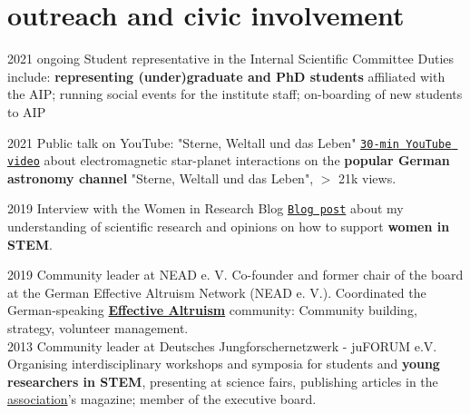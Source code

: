 \documentclass[]{k-cv} %
\begin{document}
\section{outreach and civic involvement}
\begin{entrylist}
\entry
{2021 \to ongoing}
{Student representative in the Internal Scientific Committee}
{}
{Duties include: \textbf{representing (under)graduate and PhD students} affiliated with the AIP; running social events for the institute staff; on-boarding of new students to AIP}

\entry
{2021}
{Public talk on YouTube: "Sterne, Weltall und das Leben"}
{}
{\texttt{\href{https://www.youtube.com/watch?v=LLHLobUifeY}{30-min YouTube video}} about electromagnetic star-planet interactions on the \textbf{popular German astronomy channel} "Sterne, Weltall und das Leben", $>$ 21k views.}

\entry
{2019}
{Interview with the Women in Research Blog}
{}
{\texttt{\href{https://womeninresearchblog.wordpress.com/2019/06/26/ekaterina-germany/}{Blog post}} about my understanding of scientific research and opinions on how to support \textbf{women in STEM}.}

\entry
{2019 }
{Community leader at NEAD e. V.}
{}
{Co-founder and former chair of the board at the German Effective Altruism Network (NEAD e. V.). Coordinated the German-speaking \href{https://www.effectivealtruism.com/}{\textbf{Effective Altruism}} community: Community building, strategy, volunteer management. \\}
\entry
{2013 }
{Community leader at Deutsches Jungforschernetzwerk - juFORUM e.V.}
{}
{Organising interdisciplinary workshops and symposia for students and \textbf{young researchers in STEM}, presenting at science fairs, publishing articles in the \href{https://www.juforum.de/}{association}'s magazine; member of the executive board.}
\end{entrylist}
\end{document}
